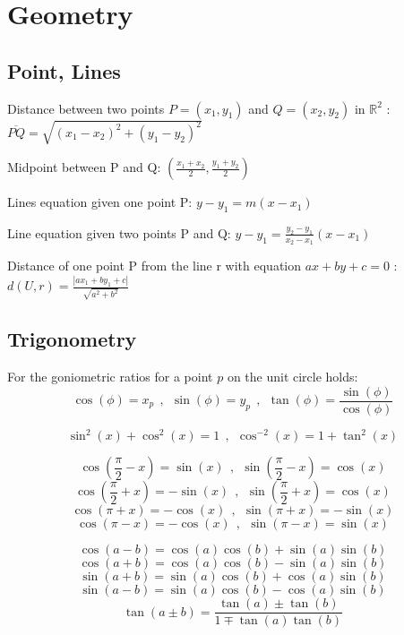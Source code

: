 \chapter{Geometry}

\section{Point, Lines}
Distance between two points $P=(x_1,y_1)$ and $Q=(x_2,y_2)$ in $\mathbb{R}^2$ : $ \overline{PQ} = \sqrt{(x_1-x_2)^2+(y_1-y_2)^2} $

Midpoint between P and Q: $\left(\frac{x_1+x_2}{2},\frac{y_1+y_2}{2}\right)$

Lines equation given one point P: $ y-y_1 = m(x-x_1) $

Line equation given two points P and Q: $ y-y_1 = \frac{y_2-y_1}{x_2-x_1}(x-x_1) $

Distance of one point P from the line r with equation $ax+by+c=0$ : $ d(U,r) = \frac{\left|ax_1+by_1+c\right|}{\sqrt{a^2+b^2}}$

\section{Trigonometry}

For the goniometric ratios for a point $p$ on the unit circle holds:
\[
\cos(\phi)=x_p~~,~~\sin(\phi)=y_p~~,~~\tan(\phi)=\frac{\sin(\phi)}{\cos(\phi)}
\]

\[
\sin^2(x)+\cos^2(x)=1 \ \ , \ \ \cos^{-2}(x)=1+\tan^2(x)
\]

\[
\cos(\frac{\pi}{2}-x)=\sin(x) \ \ , \ \ \sin(\frac{\pi}{2}-x)=\cos(x)
\]
\[
\cos(\frac{\pi}{2}+x)=-\sin(x) \ \ , \ \ \sin(\frac{\pi}{2}+x)=\cos(x)
\]
\[
\cos(\pi+x)=-\cos(x) \ \ , \ \ \sin(\pi+x)=-\sin(x)
\]
\[
\cos(\pi-x)=-\cos(x) \ \ , \ \ \sin(\pi-x)=\sin(x)
\]

\[
\cos(a-b)=\cos(a)\cos(b)+\sin(a)\sin(b)
\]
\[
\cos(a+b)=\cos(a)\cos(b)-\sin(a)\sin(b)
\]
\[
\sin(a+b)=\sin(a)\cos(b)+\cos(a)\sin(b)
\]
\[
\sin(a-b)=\sin(a)\cos(b)-\cos(a)\sin(b)
\]
\[
\tan(a\pm b)=\frac{\tan(a)\pm\tan(b)}{1\mp\tan(a)\tan(b)}
\]
